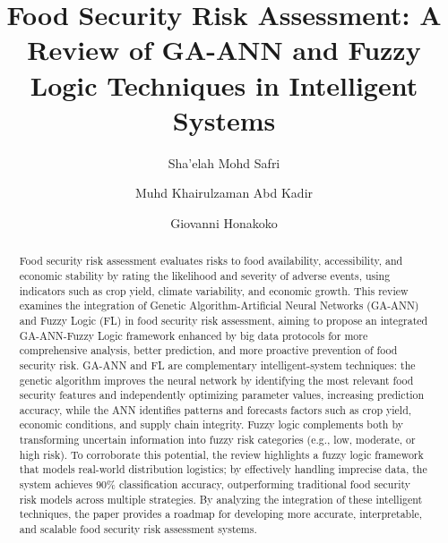 \documentclass[preprint,12pt]{elsarticle}
\begin{document}
	
	\begin{frontmatter}
		
		\title{Food Security Risk Assessment: A Review of GA-ANN and Fuzzy Logic Techniques in Intelligent Systems}
		
		\author[unikl]{Sha'elah Mohd Safri}
		
		\author[unikl]{Muhd Khairulzaman Abd Kadir}
		
		\author[uca]{Giovanni Honakoko}
		
		\address[unikl]{Electronics \& Electrical Engineering Technologies, Universiti Kuala Lumpur British Malaysian Institute (UniKL BMI)}
		\address[uca]{Polytech Nice Sophia, Universit\'e C\^ote d'Azur}
		
		
		\begin{abstract}
			Food security risk assessment evaluates risks to food availability, accessibility, and economic stability by rating the likelihood and severity of adverse events, using indicators such as crop yield, climate variability, and economic growth. This review examines the integration of Genetic Algorithm-Artificial Neural Networks (GA-ANN) and Fuzzy Logic (FL) in food security risk assessment, aiming to propose an integrated GA-ANN-Fuzzy Logic framework enhanced by big data protocols for more comprehensive analysis, better prediction, and more proactive prevention of food security risk. GA-ANN and FL are complementary intelligent-system techniques: the genetic algorithm improves the neural network by identifying the most relevant food security features and independently optimizing parameter values, increasing prediction accuracy, while the ANN identifies patterns and forecasts factors such as crop yield, economic conditions, and supply chain integrity. Fuzzy logic complements both by transforming uncertain information into fuzzy risk categories (e.g., low, moderate, or high risk). To corroborate this potential, the review highlights a fuzzy logic framework that models real-world distribution logistics; by effectively handling imprecise data, the system achieves 90\% classification accuracy, outperforming traditional food security risk models across multiple strategies. By analyzing the integration of these intelligent techniques, the paper provides a roadmap for developing more accurate, interpretable, and scalable food security risk assessment systems.
			
		\end{abstract}
		

\end{frontmatter}
\end{document}
